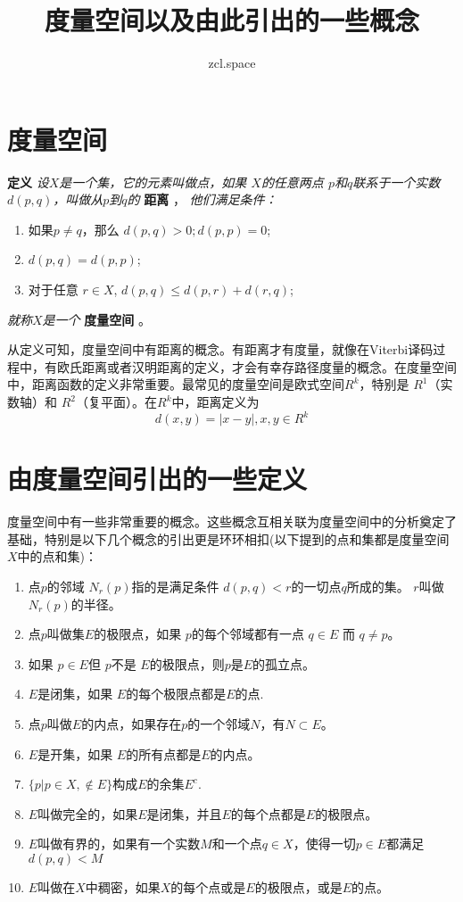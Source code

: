\documentclass[10pt,a4paper,UTF8]{article}
\author{zcl.space}
\date{}
\title{度量空间以及由此引出的一些概念}
\begin{document}
\maketitle
\tableofcontents


\section{度量空间}
\label{sec:orgheadline1}


\textbf{定义} \emph{设\(X\)是一个集，它的元素叫做点，如果 \(X\)的任意两点 \(p\)和\(q\)联系于一个实数\(d(p,q)\)，叫做从\(p\)到\(q\)的} \textbf{距离} ， \emph{他们满足条件：}

\begin{enumerate}
\item 如果\(p\neq q\)，那么 \(d(p,q)>0;d(p,p)=0\);
\item \(d(p,q)=d(p,p)\);
\item 对于任意 \(r\in X\), \(d(p,q)\leq d(p,r)+d(r,q)\);
\end{enumerate}

\emph{就称\(X\)是一个} \textbf{度量空间} 。

从定义可知，度量空间中有距离的概念。有距离才有度量，就像在Viterbi译码过程中，有欧氏距离或者汉明距离的定义，才会有幸存路径度量的概念。在度量空间中，距离函数的定义非常重要。最常见的度量空间是欧式空间\(R^{k}\)，特别是 \(R^{1}\)（实数轴）和 \(R^{2}\)（复平面）。在\(R^{k}\)中，距离定义为 \[d(x,y) = |x-y|, x,y\in R^{k}\]

\section{由度量空间引出的一些定义}
\label{sec:orgheadline2}


度量空间中有一些非常重要的概念。这些概念互相关联为度量空间中的分析奠定了基础，特别是以下几个概念的引出更是环环相扣(以下提到的点和集都是度量空间 \(X\)中的点和集)：

\begin{enumerate}
\item 点\(p\)的邻域 \(N_{r}(p)\)指的是满足条件 \(d(p,q) < r\)的一切点\(q\)所成的集。 \(r\)叫做\(N_{r}(p)\)的半径。
\item 点\(p\)叫做集\(E\)的极限点，如果 \(p\)的每个邻域都有一点 \(q\in E\) 而 \(q\neq p\)。
\item 如果 \(p\in E\)但 \(p\)不是 \(E\)的极限点，则\(p\)是\(E\)的孤立点。
\item \(E\)是闭集，如果 \(E\)的每个极限点都是\(E\)的点.
\item 点\(p\)叫做\(E\)的内点，如果存在\(p\)的一个邻域\(N\)，有\(N\subset E\)。
\item \(E\)是开集，如果 \(E\)的所有点都是\(E\)的内点。
\item \(\{p|p\in X,\notin E\}\)构成\(E\)的余集\(E^{c}\).
\item \(E\)叫做完全的，如果\(E\)是闭集，并且\(E\)的每个点都是\(E\)的极限点。
\item \(E\)叫做有界的，如果有一个实数\(M\)和一个点\(q\in X\)，使得一切\(p\in E\)都满足\(d(p,q) < M\)
\item \(E\)叫做在\(X\)中稠密，如果\(X\)的每个点或是\(E\)的极限点，或是\(E\)的点。
\end{enumerate}
\end{document}
